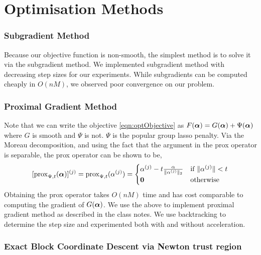 
\section{Optimisation Methods}
\label{sec:optMethods}

\subsubsection*{Subgradient Method}
Because our objective function is non-smooth, the simplest method is to solve it via 
the subgradient method. We implemented subgradient method with 
decreasing step sizes for our experiments. 
While subgradients can be computed cheaply in $O(nM)$, we observed poor 
convergence on our problem. %

\subsubsection*{Proximal Gradient Method}

Note that we can write the objective \eqref{eqn:optObjective} as $F({\bm{\alpha}}) =
G({\bm{\alpha}}) + \Psi({\bm{\alpha}})$ where $G$ is smooth and $\Psi$ is not. $\Psi$ is the
popular group lasso penalty. Via the Moreau decomposition, and using the fact
that the argument in the prox operator is separable, the prox operator can
be shown to be,
\[
[{\bf{\rm prox}}_{\Psi, t} ({\bm{\alpha}})]^{(j)} =
{\bf{\rm prox}}_{\Psi, t} ({\alpha^{(j)}}) = 
  \begin{cases}
    {\alpha^{(j)}} - t \frac{\alpha}{\|{\alpha^{(j)}}\|_2} & \text{if } 
              \|{\alpha^{(j)}}\| < t \\
    {\bf 0} & \text{otherwise}
  \end{cases}
\]
Obtaining the prox operator takes $O(nM)$ time and has cost comparable to
computing the gradient of $G({\bm{\alpha}})$. We use the above to implement proximal
gradient method as described in the class notes. We use backtracking to
determine the step size and experimented both with and without acceleration.

\subsubsection*{Exact Block Coordinate Descent via Newton trust region}

